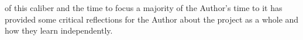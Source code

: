 %

 of this caliber and the time to focus a majority of the Author's time to it has provided some critical reflections for the Author about the project as a whole and how they learn independently.

